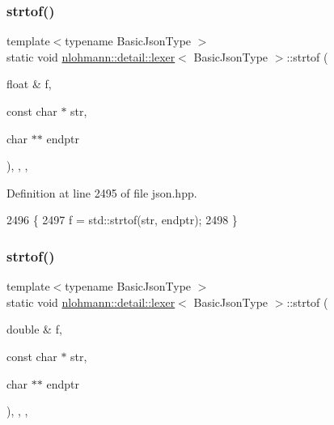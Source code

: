 \mbox{\label{classnlohmann_1_1detail_1_1lexer_a1a2d4cc5d9fed4783aa2a98497925511}} 
\subsubsection{\texorpdfstring{strtof()}{strtof()}\hspace{0.1cm}{\footnotesize\ttfamily [1/3]}}
{\footnotesize\ttfamily template$<$typename Basic\+Json\+Type $>$ \\
static void \hyperlink{classnlohmann_1_1detail_1_1lexer}{nlohmann\+::detail\+::lexer}$<$ Basic\+Json\+Type $>$\+::strtof (\begin{DoxyParamCaption}\item[{float \&}]{f,  }\item[{const char $\ast$}]{str,  }\item[{char $\ast$$\ast$}]{endptr }\end{DoxyParamCaption})\hspace{0.3cm}{\ttfamily [inline]}, {\ttfamily [static]}, {\ttfamily [private]}, {\ttfamily [noexcept]}}



Definition at line 2495 of file json.\+hpp.


\begin{DoxyCode}
2496     \{
2497         f = std::strtof(str, endptr);
2498     \}
\end{DoxyCode}
\mbox{\label{classnlohmann_1_1detail_1_1lexer_a8cd877d10b31bc819e4f030292737ea6}} 
\subsubsection{\texorpdfstring{strtof()}{strtof()}\hspace{0.1cm}{\footnotesize\ttfamily [2/3]}}
{\footnotesize\ttfamily template$<$typename Basic\+Json\+Type $>$ \\
static void \hyperlink{classnlohmann_1_1detail_1_1lexer}{nlohmann\+::detail\+::lexer}$<$ Basic\+Json\+Type $>$\+::strtof (\begin{DoxyParamCaption}\item[{double \&}]{f,  }\item[{const char $\ast$}]{str,  }\item[{char $\ast$$\ast$}]{endptr }\end{DoxyParamCaption})\hspace{0.3cm}{\ttfamily [inline]}, {\ttfamily [static]}, {\ttfamily [private]}, {\ttfamily [noexcept]}}




